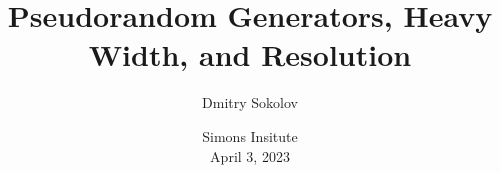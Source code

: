 

\titlegraphic{
    
}


\title[]{
    Pseudorandom Generators, Heavy Width, and Resolution
}

\author{
    Dmitry Sokolov
}  


\date{Simons Insitute\\ April 3, 2023}

\newcommand{\SPCR}{\PrSys{S}\text{-}\PrSys{PCR}}
\newcommand{\SSOS}{\PrSys{S}\text{-}\PrSys{SOS}}




    \maketitle

    
    
    
    

